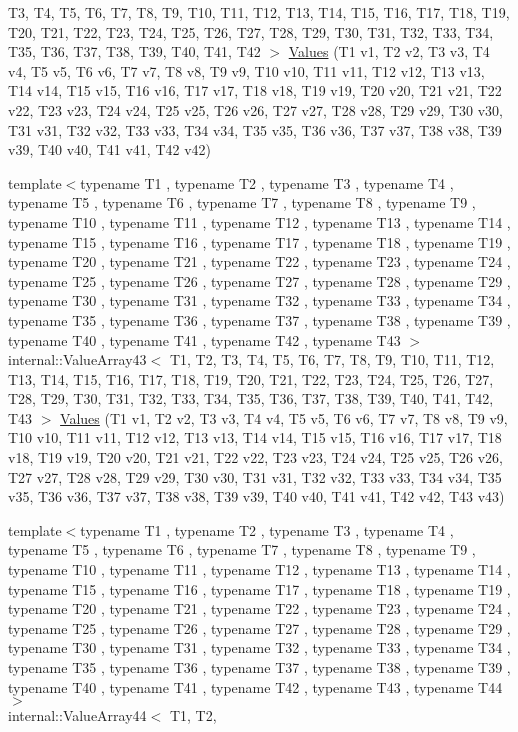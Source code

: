 \begin{DoxyCompactItemize}
\-T3, \-T4, \-T5, \-T6, \-T7, \-T8, \-T9, \*
\-T10, \-T11, \-T12, \-T13, \-T14, \-T15, \*
\-T16, \-T17, \-T18, \-T19, \-T20, \-T21, \*
\-T22, \-T23, \-T24, \-T25, \-T26, \-T27, \*
\-T28, \-T29, \-T30, \-T31, \-T32, \-T33, \*
\-T34, \-T35, \-T36, \-T37, \-T38, \-T39, \*
\-T40, \-T41, \-T42 $>$ \hyperlink{namespacetesting_a0951fc3989cde27914791eb120f8f01c}{\-Values} (\-T1 v1, \-T2 v2, \-T3 v3, \-T4 v4, \-T5 v5, \-T6 v6, \-T7 v7, \-T8 v8, \-T9 v9, \-T10 v10, \-T11 v11, \-T12 v12, \-T13 v13, \-T14 v14, \-T15 v15, \-T16 v16, \-T17 v17, \-T18 v18, \-T19 v19, \-T20 v20, \-T21 v21, \-T22 v22, \-T23 v23, \-T24 v24, \-T25 v25, \-T26 v26, \-T27 v27, \-T28 v28, \-T29 v29, \-T30 v30, \-T31 v31, \-T32 v32, \-T33 v33, \-T34 v34, \-T35 v35, \-T36 v36, \-T37 v37, \-T38 v38, \-T39 v39, \-T40 v40, \-T41 v41, \-T42 v42)
\item 
{\footnotesize template$<$typename T1 , typename T2 , typename T3 , typename T4 , typename T5 , typename T6 , typename T7 , typename T8 , typename T9 , typename T10 , typename T11 , typename T12 , typename T13 , typename T14 , typename T15 , typename T16 , typename T17 , typename T18 , typename T19 , typename T20 , typename T21 , typename T22 , typename T23 , typename T24 , typename T25 , typename T26 , typename T27 , typename T28 , typename T29 , typename T30 , typename T31 , typename T32 , typename T33 , typename T34 , typename T35 , typename T36 , typename T37 , typename T38 , typename T39 , typename T40 , typename T41 , typename T42 , typename T43 $>$ }\\internal\-::\-Value\-Array43$<$ \-T1, \-T2, \*
\-T3, \-T4, \-T5, \-T6, \-T7, \-T8, \-T9, \*
\-T10, \-T11, \-T12, \-T13, \-T14, \-T15, \*
\-T16, \-T17, \-T18, \-T19, \-T20, \-T21, \*
\-T22, \-T23, \-T24, \-T25, \-T26, \-T27, \*
\-T28, \-T29, \-T30, \-T31, \-T32, \-T33, \*
\-T34, \-T35, \-T36, \-T37, \-T38, \-T39, \*
\-T40, \-T41, \-T42, \-T43 $>$ \hyperlink{namespacetesting_a316b2e13e635215ac89a50315bb66d81}{\-Values} (\-T1 v1, \-T2 v2, \-T3 v3, \-T4 v4, \-T5 v5, \-T6 v6, \-T7 v7, \-T8 v8, \-T9 v9, \-T10 v10, \-T11 v11, \-T12 v12, \-T13 v13, \-T14 v14, \-T15 v15, \-T16 v16, \-T17 v17, \-T18 v18, \-T19 v19, \-T20 v20, \-T21 v21, \-T22 v22, \-T23 v23, \-T24 v24, \-T25 v25, \-T26 v26, \-T27 v27, \-T28 v28, \-T29 v29, \-T30 v30, \-T31 v31, \-T32 v32, \-T33 v33, \-T34 v34, \-T35 v35, \-T36 v36, \-T37 v37, \-T38 v38, \-T39 v39, \-T40 v40, \-T41 v41, \-T42 v42, \-T43 v43)
\item 
{\footnotesize template$<$typename T1 , typename T2 , typename T3 , typename T4 , typename T5 , typename T6 , typename T7 , typename T8 , typename T9 , typename T10 , typename T11 , typename T12 , typename T13 , typename T14 , typename T15 , typename T16 , typename T17 , typename T18 , typename T19 , typename T20 , typename T21 , typename T22 , typename T23 , typename T24 , typename T25 , typename T26 , typename T27 , typename T28 , typename T29 , typename T30 , typename T31 , typename T32 , typename T33 , typename T34 , typename T35 , typename T36 , typename T37 , typename T38 , typename T39 , typename T40 , typename T41 , typename T42 , typename T43 , typename T44 $>$ }\\internal\-::\-Value\-Array44$<$ \-T1, \-T2, \*

\end{DoxyCompactItemize}
